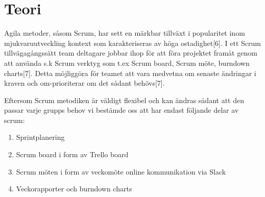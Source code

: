 \section{Teori}
\label{sec:Lieth-Teori}
Agila metoder, såsom Scrum, har sett en märkbar tillväxt i popularitet inom mjukvaruutveckling kontext som karakteriseras av höga ostadighet[6]. I ett Scrum 
tillvägagångssätt team deltagare jobbar ihop för att föra projektet framåt genom att använda s.k Scrum verktyg som t.ex Scrum board, Scrum möte, burndown 
charts[7]. Detta möjliggöra för teamet att vara medvetna om senaste ändringar i kraven och om-prioriterar om det sådant behövs[7]. 

Eftersom Scrum metodiken är väldigt flexibel och kan ändras sådant att den passar varje grupps behov vi bestämde oss att har endast följande delar av scrum:

\begin{enumerate}
	\item Sprintplanering

	\item Scrum board  i form av Trello board
	
	\item Scrum möten i form av veckomöte online kommunikation via Slack
	
	\item Veckorapporter och burndown charts
	
\end{enumerate}
